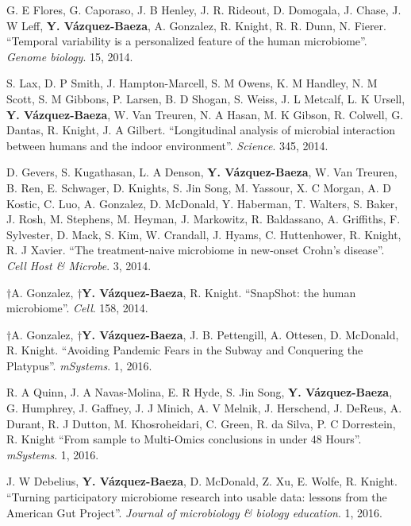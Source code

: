 \begin{frontmatter}
\begin{vitapage}
\begin{publications}
    \item G. E Flores, G. Caporaso, J. B Henley, J. R. Rideout, D. Domogala, J. Chase, J. W Leff, \textbf{Y. V\'azquez-Baeza}, A. Gonzalez, R. Knight, R. R. Dunn, N. Fierer. ``Temporal variability is a personalized feature of the human microbiome''. \emph{Genome biology}. 15, 2014.

    \item S. Lax, D. P Smith, J. Hampton-Marcell, S. M Owens, K. M Handley, N. M Scott, S. M Gibbons, P. Larsen, B. D Shogan, S. Weiss, J. L Metcalf, L. K Ursell, \textbf{Y. V\'azquez-Baeza}, W. Van Treuren, N. A Hasan, M. K Gibson, R. Colwell, G. Dantas, R. Knight, J. A Gilbert. ``Longitudinal analysis of microbial interaction between humans and the indoor environment''. \emph{Science}. 345, 2014.

    \item D. Gevers, S. Kugathasan, L. A Denson, \textbf{Y. V\'azquez-Baeza}, 
        W. Van Treuren, B. Ren, E. Schwager, D. Knights, S. Jin Song, M.  
        Yassour, X. C Morgan, A. D Kostic, C. Luo, A. Gonzalez, D. McDonald, Y.  
        Haberman, T. Walters, S. Baker, J. Rosh, M. Stephens, M. Heyman, J.  
        Markowitz, R. Baldassano, A. Griffiths, F. Sylvester, D. Mack, S. Kim, 
        W. Crandall, J. Hyams, C. Huttenhower, R. Knight, R. J Xavier. ``The 
        treatment-naive microbiome in new-onset Crohn's disease''. \emph{Cell 
        Host \& Microbe}. 3, 2014.

    \item $\dagger$A. Gonzalez, \textbf{$\dagger$Y. V\'azquez-Baeza}, R.  
        Knight. ``SnapShot: the human microbiome''. \emph{Cell}. 158, 2014.

    \item $\dagger$A. Gonzalez, \textbf{$\dagger$Y. V\'azquez-Baeza},  J. B. Pettengill, A. Ottesen, D. McDonald, R. Knight. ``Avoiding Pandemic Fears in the Subway and Conquering the Platypus''. \emph{mSystems}. 1, 2016.

    \item R. A Quinn, J. A Navas-Molina, E. R Hyde, S. Jin Song, \textbf{Y. V\'azquez-Baeza}, G. Humphrey, J. Gaffney, J. J Minich, A. V Melnik, J. Herschend, J. DeReus, A. Durant, R. J Dutton, M. Khosroheidari, C. Green, R. da Silva, P. C Dorrestein, R. Knight ``From sample to Multi-Omics conclusions in under 48 Hours''. \emph{mSystems}. 1, 2016.

    \item J. W Debelius, \textbf{Y. V\'azquez-Baeza}, D. McDonald, Z. Xu, E. Wolfe, R. Knight. ``Turning participatory microbiome research into usable data: lessons from the American Gut Project''. \emph{Journal of microbiology \& biology education}. 1, 2016.


\end{publications}
\end{vitapage}
\end{frontmatter}
